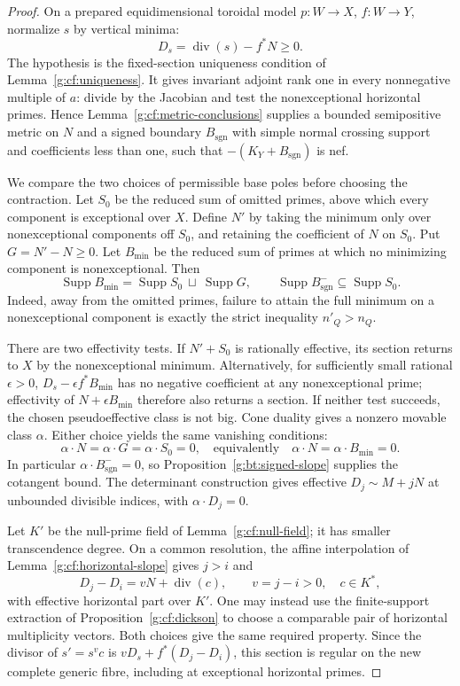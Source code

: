 \begin{proof}
On a prepared equidimensional toroidal model $p:W\to X$, $f:W\to Y$,
normalize $s$ by vertical minima:
\[
 D_s=\operatorname{div}(s)-f^*N\geq0.
\]
The hypothesis is the fixed-section uniqueness condition of
Lemma~\ref{g:cf:uniqueness}. It gives invariant adjoint rank one
in every nonnegative multiple of $a$: divide by the Jacobian and
test the nonexceptional horizontal primes. Hence
Lemma~\ref{g:cf:metric-conclusions} supplies a bounded semipositive
metric on $N$ and a signed boundary $B_{\mathrm{sgn}}$ with simple
normal crossing support and coefficients less than one, such that
$-(K_Y+B_{\mathrm{sgn}})$ is nef.

We compare the two choices of permissible base poles before choosing
the contraction. Let $S_0$ be the reduced sum of omitted primes,
above which every component is exceptional over $X$. Define $N'$
by taking the minimum only over nonexceptional components off $S_0$,
and retaining the coefficient of $N$ on $S_0$. Put $G=N'-N\geq0$.
Let $B_{\min}$ be the reduced sum of primes at which no minimizing
component is nonexceptional. Then
\[
 \operatorname{Supp}B_{\min}
   =\operatorname{Supp}S_0\ \sqcup\ \operatorname{Supp}G,
 \qquad
 \operatorname{Supp}B_{\mathrm{sgn}}^-
   \subseteq\operatorname{Supp}S_0.
\]
Indeed, away from the omitted primes, failure to attain the full
minimum on a nonexceptional component is exactly the strict inequality
$n'_Q>n_Q$.

There are two effectivity tests. If $N'+S_0$ is rationally effective,
its section returns to $X$ by the nonexceptional minimum. Alternatively,
for sufficiently small rational $\epsilon>0$,
$D_s-\epsilon f^*B_{\min}$ has no negative coefficient at any
nonexceptional prime; effectivity of $N+\epsilon B_{\min}$ therefore
also returns a section. If neither test succeeds, the chosen
pseudoeffective class is not big. Cone duality gives a nonzero movable
class $\alpha$. Either choice yields the same vanishing conditions:
\[
 \alpha\cdot N=\alpha\cdot G=\alpha\cdot S_0=0,
 \quad\text{equivalently}\quad
 \alpha\cdot N=\alpha\cdot B_{\min}=0.
\]
In particular $\alpha\cdot B_{\mathrm{sgn}}^-=0$, so
Proposition~\ref{g:bt:signed-slope} supplies the cotangent bound.
The determinant construction gives effective
$D_j\sim M+jN$ at unbounded divisible indices, with
$\alpha\cdot D_j=0$.

Let $K'$ be the null-prime field of Lemma~\ref{g:cf:null-field};
it has smaller transcendence degree. On a common resolution, the
affine interpolation of Lemma~\ref{g:cf:horizontal-slope} gives
$j>i$ and
\[
 D_j-D_i=vN+\operatorname{div}(c),\qquad v=j-i>0,\quad c\in K^*,
\]
with effective horizontal part over $K'$. One may instead use
the finite-support extraction of Proposition~\ref{g:cf:dickson}
to choose a comparable pair of horizontal multiplicity vectors.
Both choices give the same required property. Since the divisor
of $s'=s^vc$ is $vD_s+f^*(D_j-D_i)$, this section is regular on
the new complete generic fibre, including at exceptional horizontal
primes.


\end{proof}
